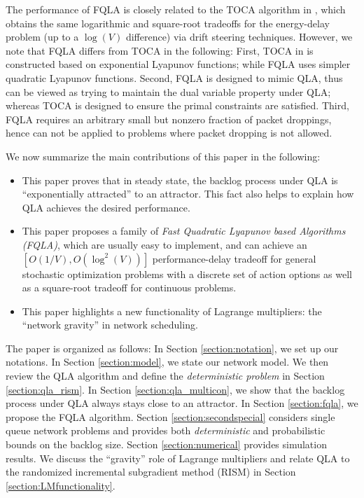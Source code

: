 \documentclass[journal]{IEEEtran}
\begin{document}
The performance of FQLA is closely related to the TOCA algorithm in \cite{neelyenergydelay}, which obtains the same logarithmic and square-root tradeoffs for the  energy-delay problem (up to a $\log(V)$ difference) via drift steering techniques. However, we note that FQLA differs from TOCA in the following: First,  TOCA in \cite{neelyenergydelay} is constructed based on exponential Lyapunov functions; while FQLA uses simpler quadratic Lyapunov functions. Second, FQLA is designed to mimic QLA, thus can be viewed as trying to maintain the dual variable property under QLA; whereas TOCA is designed to ensure the primal constraints are satisfied. Third, FQLA requires an arbitrary small but nonzero fraction of packet droppings, hence can not be applied to problems where packet dropping is not allowed.  

We now summarize the main contributions of this paper in the following:
\begin{itemize}
\item This paper proves that in steady state, the backlog process under QLA is ``exponentially attracted'' to an attractor. This fact also helps to explain how QLA achieves the desired performance.
\item This paper proposes a family of \emph{Fast Quadratic Lyapunov based Algorithms (FQLA)}, which are usually easy to implement, and can achieve an $[O(1/V), O(\log^2(V))]$ performance-delay tradeoff for general stochastic optimization problems with a discrete set of action options as well as a square-root tradeoff for continuous problems. 
\item This paper highlights a new functionality of Lagrange multipliers: the ``network gravity''  in network scheduling. 

\end{itemize}

 
The paper is organized as follows: In Section \ref{section:notation}, we set up our notations. In Section \ref{section:model}, we state our network model. We then review the QLA algorithm and define the \emph{deterministic problem} in Section \ref{section:qla_rism}. In Section \ref{section:qla_multicon}, we show that the backlog process under QLA always stays close to an attractor. In Section \ref{section:fqla}, we propose the FQLA algorithm. Section \ref{section:secondspecial} considers single queue network problems and provides both \emph{deterministic} and probabilistic bounds on the backlog size. Section \ref{section:numerical} provides simulation results. 
We discuss the ``gravity'' role of Lagrange multipliers and relate QLA to the randomized incremental subgradient method (RISM)  \cite{bertsekasoptbook} in Section \ref{section:LMfunctionality}. 
\end{document}
